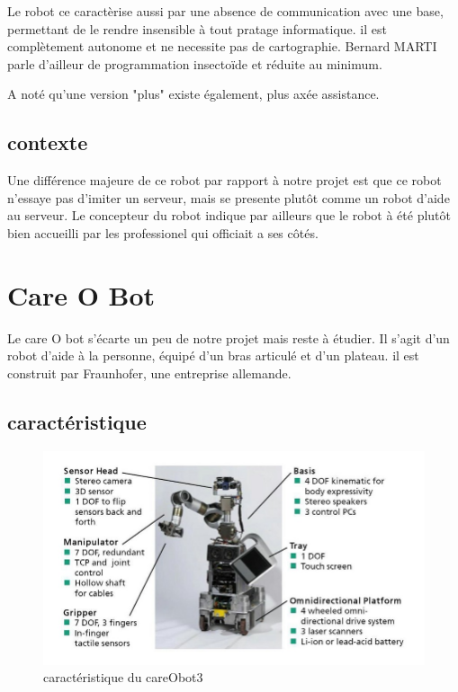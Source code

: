 Le robot ce caractèrise aussi par une absence de communication avec
une base, permettant de le rendre insensible à tout pratage
informatique. il est complètement autonome et ne necessite pas de
cartographie. Bernard MARTI parle d'ailleur de programmation
insectoïde et réduite au minimum.

A noté qu'une version "plus" existe également, plus axée assistance.

\subsection{contexte}

Une différence majeure de ce robot par rapport à notre projet est que ce robot n'essaye pas d'imiter un serveur, mais se presente plutôt comme un robot d'aide au serveur. Le concepteur du robot indique par ailleurs que le robot à été plutôt bien accueilli par les professionel qui officiait a ses côtés. 

\section{Care O Bot}

Le care O bot s'écarte un peu de notre projet mais reste à étudier. Il
s'agit d'un robot d'aide à la personne, équipé d'un bras articulé et
d'un plateau. il est construit par Fraunhofer, une entreprise
allemande.

\subsection{caractéristique}

\begin{figure}[h]
\begin{center}
\includegraphics[scale=0.55]{Images/cob3-hardware.jpg}
\caption{caractéristique du careObot3}
\label{caractéristique du careObot3}
\end{center}
\end{figure}

